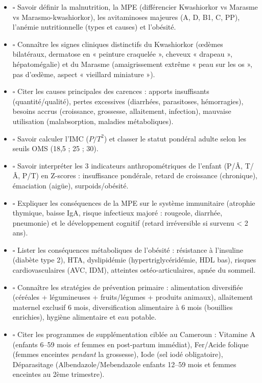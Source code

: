 \documentclass[11pt]{article}
\begin{document}
\begin{aretenir}
\begin{itemize}
  \item $\square$ Savoir définir la malnutrition, la MPE (différencier Kwashiorkor vs Marasme vs Marasmo-kwashiorkor), les avitaminoses majeures (A, D, B1, C, PP), l'anémie nutritionnelle (types et causes) et l'obésité.
  \item $\square$ Connaître les signes cliniques distinctifs du Kwashiorkor (œdèmes bilatéraux, dermatose en « peinture craquelée », cheveux « drapeau », hépatomégalie) et du Marasme (amaigrissement extrême « peau sur les os », pas d'œdème, aspect « vieillard miniature »).
  \item $\square$ Citer les causes principales des carences : apports insuffisants (quantité/qualité), pertes excessives (diarrhées, parasitoses, hémorragies), besoins accrus (croissance, grossesse, allaitement, infection), mauvaise utilisation (malabsorption, maladies métaboliques).
  \item $\square$ Savoir calculer l'IMC ($P/T^2$) et classer le statut pondéral adulte selon les seuils OMS (18,5 ; 25 ; 30).
  \item $\square$ Savoir interpréter les 3 indicateurs anthropométriques de l'enfant (P/Â, T/Â, P/T) en Z-scores : insuffisance pondérale, retard de croissance (chronique), émaciation (aigüe), surpoids/obésité.
  \item $\square$ Expliquer les conséquences de la MPE sur le système immunitaire (atrophie thymique, baisse IgA, risque infectieux majoré : rougeole, diarrhée, pneumonie) et le développement cognitif (retard irréversible si survenu < 2 ans).
  \item $\square$ Lister les conséquences métaboliques de l'obésité : résistance à l'insuline (diabète type 2), HTA, dyslipidémie (hypertriglycéridémie, HDL bas), risques cardiovasculaires (AVC, IDM), atteintes ostéo-articulaires, apnée du sommeil.
  \item $\square$ Connaître les stratégies de prévention primaire : alimentation diversifiée (céréales + légumineuses + fruits/légumes + produits animaux), allaitement maternel exclusif 6 mois, diversification alimentaire à 6 mois (bouillies enrichies), hygiène alimentaire et eau potable.
  \item $\square$ Citer les programmes de supplémentation ciblée au Cameroun : Vitamine A (enfants 6--59 mois \emph{et} femmes en post-partum immédiat), Fer/Acide folique (femmes enceintes \emph{pendant} la grossesse), Iode (sel iodé obligatoire), Déparasitage (Albendazole/Mebendazole enfants 12--59 mois et femmes enceintes au 2ème trimestre).

\end{itemize}
\end{aretenir}
\end{document}
